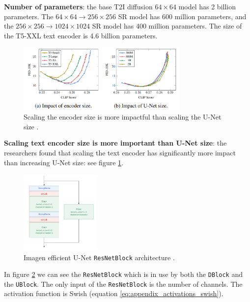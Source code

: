 \textbf{Number of parameters}: the base T2I diffusion $64\times 64$ model has 2 billion parameters. The $64\times 64 \rightarrow 256\times 256$ SR model has 600 million parameters, and the $256\times 256 \rightarrow 1024\times 1024$ SR model has 400 million parameters. The size of the T5-XXL text encoder is 4.6 billion parameters.

\begin{figure}
    \centering
    \includegraphics[width=0.75\textwidth]{images/imagen/encoder_vs_unet_size_impact.png}
    \caption{Scaling the encoder size is more impactful than scaling the U-Net size \cite{imagen}.}
    \label{fig:imagen_scaling_encoder_more_impactful_than_unet_scaling}
\end{figure}

\textbf{Scaling text encoder size is more important than U-Net size}: the researchers found that scaling the text encoder has significantly more impact than increasing U-Net size: see figure \ref{fig:imagen_scaling_encoder_more_impactful_than_unet_scaling}.




\begin{figure}
    \centering
    \includegraphics[width=0.35\textwidth]{images/appendix/imagen/unet_resnetblock.png}
    \caption{Imagen efficient U-Net \texttt{ResNetBlock} architecture \cite{imagen}.}
    \label{fig:imagen_resnetblock}
\end{figure}

In figure \ref{fig:imagen_resnetblock} we can see the \texttt{ResNetBlock} which is in use by both the \texttt{DBlock} and the \texttt{UBlock}. The only input of the \texttt{ResNetBlock} is the number of channels. The activation function is Swish (equation \ref{eq:appendix_activations_swish}). 

